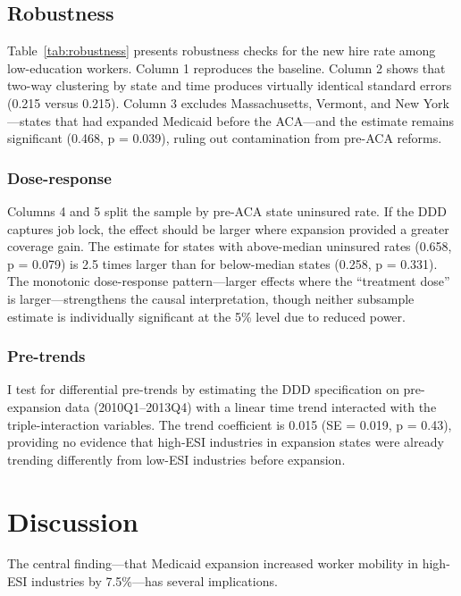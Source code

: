 \documentclass[12pt]{article}
\begin{document}
\subsection{Robustness}

{\small}

Table~\ref{tab:robustness} presents robustness checks for the new hire rate among low-education workers. Column 1 reproduces the baseline. Column 2 shows that two-way clustering by state and time produces virtually identical standard errors (0.215 versus 0.215). Column 3 excludes Massachusetts, Vermont, and New York---states that had expanded Medicaid before the ACA---and the estimate remains significant (0.468, p = 0.039), ruling out contamination from pre-ACA reforms.

\subsubsection*{Dose-response} Columns 4 and 5 split the sample by pre-ACA state uninsured rate. If the DDD captures job lock, the effect should be larger where expansion provided a greater coverage gain. The estimate for states with above-median uninsured rates (0.658, p = 0.079) is 2.5 times larger than for below-median states (0.258, p = 0.331). The monotonic dose-response pattern---larger effects where the ``treatment dose'' is larger---strengthens the causal interpretation, though neither subsample estimate is individually significant at the 5\% level due to reduced power.

\subsubsection*{Pre-trends} I test for differential pre-trends by estimating the DDD specification on pre-expansion data (2010Q1--2013Q4) with a linear time trend interacted with the triple-interaction variables. The trend coefficient is 0.015 (SE = 0.019, p = 0.43), providing no evidence that high-ESI industries in expansion states were already trending differently from low-ESI industries before expansion.

\section{Discussion}

The central finding---that Medicaid expansion increased worker mobility in high-ESI industries by 7.5\%---has several implications.
\end{document}
